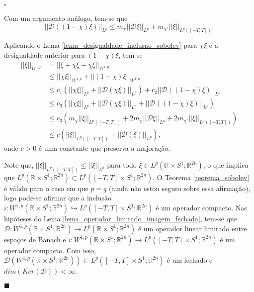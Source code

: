 \documentclass[12pt]{book}
\newenvironment{prova}[1]{$\square$ #1}{\hfill$\blacksquare$}
\newcommand{\circulo}{S^{1}}
\newcommand{\diferencialfloerabrev}{\mathcal{D}}
\newcommand{\espacoLpcontradominio}[2]{L^{p}(#1;#2)}
\newcommand{\espacosobolevcontradominio}[2]{W^{1,p}(#1;#2)}
\newcommand{\intervalofechado}[1]{[-#1,#1]}
\newcommand{\normaLp}[1]{||#1||_{L^{p}}}
\newcommand{\normaLpDominio}[2]{||#1||_{L^{p}(#2)}}
\newcommand{\normaWp}[1]{||#1||_{W^{1,p}}}
\newcommand{\retacartesianocirculo}{\real{} \times \circulo}
\newcommand{\real}[1]{\mathbb{R}^{#1}}
\newcommand{\alerta}[1]{{\color{red}#1}}
\begin{document}
\begin{prova}
\begin{enumerate}
			Com um argumento análogo, tem-se que
			$$
			\normaLp{\diferencialfloerabrev((1-\chi)\xi)} \leq m_{\chi}\normaLp{\diferencialfloerabrev\xi } +	m_{\chi'}\normaLpDominio{\xi}{\intervalofechado{T}}.
			$$	
			
			Aplicando o Lema \ref{lema_desigualdade_inclusao_sobolev} para $\chi\xi$ e a desigualdade anterior para $(1-\chi)\xi$, tem-se
			$$
			\begin{aligned}
			\normaWp{\xi} 
			&= \normaWp{\xi + \chi\xi - \chi\xi}
			\\
			&\leq  \normaWp{\chi\xi }+ \normaWp{(1-\chi)\xi}
			\\
			&\leq c_{1}( \normaLp{\chi\xi}+\normaLp{\diferencialfloerabrev (\chi\xi)}) + c_{2}\normaLp{\diferencialfloerabrev((1-\chi)\xi)}
			\\
			&\leq c_{3}( \normaLp{\chi\xi}+\normaLp{\diferencialfloerabrev (\chi\xi)} + \normaLp{\diferencialfloerabrev((1-\chi)\xi)})
			\\
			&\leq c_{3}(m_{\chi}\normaLpDominio{\xi}{\intervalofechado{T}}+2m_{\chi}\normaLp{\diferencialfloerabrev \xi} + 2m_{\chi'}\normaLpDominio{\xi}{\intervalofechado{T}})  
			\\
			&\leq c(\normaLpDominio{\xi}{\intervalofechado{T}}+\normaLp{\diferencialfloerabrev (\xi)}),
			\end{aligned}
			$$
			onde $c>0$ é uma constante que preserva a majoração.
			
			Note que, $\normaLpDominio{\xi}{\intervalofechado{T}}\leq \normaLp{\xi}$ para todo $\xi \in \espacoLpcontradominio{\retacartesianocirculo}{\real{2n}}$, o que implica que $\espacoLpcontradominio{\retacartesianocirculo}{\real{2n}} \subset \espacoLpcontradominio{\intervalofechado{T}\times \circulo}{\real{2n}}$. O Teorema \ref{teorema_sobolev} é válido para o caso em que $p=q$ \alerta{(ainda não estou seguro sobre essa afirmação)}, logo pode-se afirmar que a inclusão $i: \espacosobolevcontradominio{\retacartesianocirculo}{\real{2n}} \hookrightarrow  \espacoLpcontradominio{\intervalofechado{T}\times \circulo}{\real{2n}}$ é um operador compacto. Nas hipóteses do Lema \ref{lema_operador_limitado_imagem_fechada}, tem-se que $\diferencialfloerabrev: \espacosobolevcontradominio{\retacartesianocirculo}{\real{2n}} \to \espacoLpcontradominio{\retacartesianocirculo}{\real{2n}}$ é um operador linear limitado entre espaços de Banach e $i: \espacosobolevcontradominio{\retacartesianocirculo}{\real{2n}} \to \espacoLpcontradominio{\intervalofechado{T}\times \circulo}{\real{2n}}$ é um operador compacto. Com isso, $\diferencialfloerabrev(\espacosobolevcontradominio{\retacartesianocirculo}{\real{2n}}) \subset \espacoLpcontradominio{\intervalofechado{T}\times \circulo}{\real{2n}}$ é um fechado e $dim(Ker(\diferencialfloerabrev)) < \infty$.
			

\end{enumerate}
\end{prova}
\end{document}
